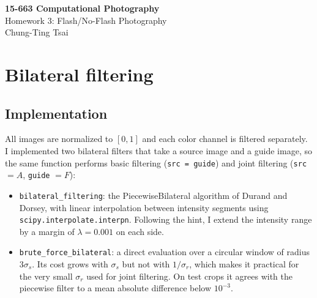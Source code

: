 \documentclass[11pt]{article}
\begin{document}
\begin{center}
{\Large\bfseries 15-663 Computational Photography}\\[4pt]
{\large Homework 3: Flash/No-Flash Photography}\\[4pt]
Chung-Ting Tsai
\end{center}

\section{Bilateral filtering}
\subsection*{Implementation}
All images are normalized to $[0,1]$ and each color channel is filtered separately. I implemented two bilateral filters that take a source image and a guide image, so the same function performs basic filtering (\texttt{src = guide}) and joint filtering (\texttt{src} $=A$, \texttt{guide} $=F$):
\begin{itemize}\setlength{\itemsep}{0pt}
\item \texttt{bilateral\_filtering}: the PiecewiseBilateral algorithm of Durand and Dorsey, with linear interpolation between intensity segments using \texttt{scipy.interpolate.interpn}. Following the hint, I extend the intensity range by a margin of $\lambda=0.001$ on each side.
\item \texttt{brute\_force\_bilateral}: a direct evaluation over a circular window of radius $3\sigma_s$. Its cost grows with $\sigma_s$ but not with $1/\sigma_r$, which makes it practical for the very small $\sigma_r$ used for joint filtering. On test crops it agrees with the piecewise filter to a mean absolute difference below $10^{-3}$.
\end{itemize}
\end{document}
